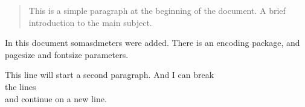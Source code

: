\documentclass[12pt, letterpaper, twoside]{article}
\begin{document}
\begin{abstract}
This is a simple paragraph at the beginning of the document. A brief introduction to the main subject.
\end{abstract}

In this document somasdmeters
were added. There is an encoding package,
and pagesize and fontsize parameters.

This line will start a second paragraph. And I can
 break\\ the lines \\ and continue on a new line.
\end{document}

